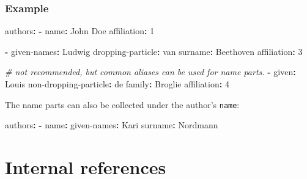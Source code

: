 \documentclass[
]{article}
\newenvironment{Shaded}{}{}
\newcommand{\AttributeTok}[1]{\textcolor[rgb]{0.49,0.56,0.16}{#1}}
\newcommand{\CommentTok}[1]{\textcolor[rgb]{0.38,0.63,0.69}{\textit{#1}}}
\newcommand{\FunctionTok}[1]{\textcolor[rgb]{0.02,0.16,0.49}{#1}}
\newcommand{\KeywordTok}[1]{\textcolor[rgb]{0.00,0.44,0.13}{\textbf{#1}}}
\newcommand{\StringTok}[1]{\textcolor[rgb]{0.25,0.44,0.63}{#1}}
\begin{document}
\hypertarget{example}{%
\subsubsection{Example}\label{example}}

\begin{Shaded}
\begin{Highlighting}[]
\FunctionTok{authors}\KeywordTok{:}
\AttributeTok{  }\KeywordTok{{-}}\AttributeTok{ }\FunctionTok{name}\KeywordTok{:}\AttributeTok{ John Doe}
\AttributeTok{    }\FunctionTok{affiliation}\KeywordTok{:}\AttributeTok{ }\StringTok{\textquotesingle{}1\textquotesingle{}}

\AttributeTok{  }\KeywordTok{{-}}\AttributeTok{ }\FunctionTok{given{-}names}\KeywordTok{:}\AttributeTok{ Ludwig}
\AttributeTok{    }\FunctionTok{dropping{-}particle}\KeywordTok{:}\AttributeTok{ van}
\AttributeTok{    }\FunctionTok{surname}\KeywordTok{:}\AttributeTok{ Beethoven}
\AttributeTok{    }\FunctionTok{affiliation}\KeywordTok{:}\AttributeTok{ }\StringTok{\textquotesingle{}3\textquotesingle{}}

\CommentTok{  \# not recommended, but common aliases can be used for name parts.}
\AttributeTok{  }\KeywordTok{{-}}\AttributeTok{ }\FunctionTok{given}\KeywordTok{:}\AttributeTok{ Louis}
\AttributeTok{    }\FunctionTok{non{-}dropping{-}particle}\KeywordTok{:}\AttributeTok{ de}
\AttributeTok{    }\FunctionTok{family}\KeywordTok{:}\AttributeTok{ Broglie}
\AttributeTok{    }\FunctionTok{affiliation}\KeywordTok{:}\AttributeTok{ }\StringTok{\textquotesingle{}4\textquotesingle{}}
\end{Highlighting}
\end{Shaded}

The name parts can also be collected under the author's \texttt{name}:

\begin{Shaded}
\begin{Highlighting}[]
\FunctionTok{authors}\KeywordTok{:}
\AttributeTok{  }\KeywordTok{{-}}\AttributeTok{ }\FunctionTok{name}\KeywordTok{:}
\AttributeTok{      }\FunctionTok{given{-}names}\KeywordTok{:}\AttributeTok{ Kari}
\AttributeTok{      }\FunctionTok{surname}\KeywordTok{:}\AttributeTok{ Nordmann}
\end{Highlighting}
\end{Shaded}

\hypertarget{internal-references}{%
\section{Internal references}\label{internal-references}}
\end{document}
